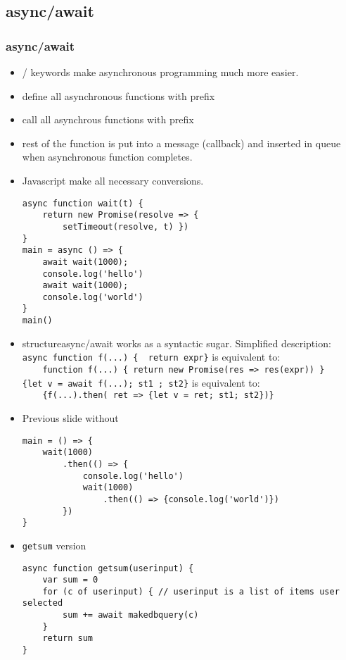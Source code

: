 \documentclass[trans,compress,xcolor=table]{beamer}
\begin{document}
\subsection*{async/await}
\begin{frame}[fragile]
\frametitle{async/await}
\begin{itemize}
\item {}/ keywords make
asynchronous programming much more easier.
\item define all asynchronous functions with  prefix
\item call all asynchrous functions with  prefix
\item rest of the function is put into a message (callback) and inserted in queue when asynchronous function completes.
\item Javascript make all necessary conversions.
\begin{lstlisting}
async function wait(t) {
	return new Promise(resolve => {
		setTimeout(resolve, t) })
}
main = async () => {
	await wait(1000);
	console.log('hello')
	await wait(1000);
	console.log('world')
}
main()
\end{lstlisting}
\end{itemize}
\end{frame}

\begin{frame}[fragile]
\begin{itemize}
\item structure{async/await} works as a syntactic sugar. Simplified description:\\
\lstinline!async function f(...) {  return expr}! is equivalent to:\\
\lstinline!    function f(...) { return new Promise(res => res(expr)) }!\\[1em]

\lstinline!{let v = await f(...); st1 ; st2}! is equivalent to:\\
\lstinline!    {f(...).then( ret => {let v = ret; st1; st2})}!
\item Previous slide without 
\begin{lstlisting}
main = () => {
	wait(1000)
		.then(() => {
			console.log('hello')
			wait(1000)
				.then(() => {console.log('world')})
		})
}
\end{lstlisting}
\end{itemize}
\end{frame}

\begin{frame}[fragile]
\begin{itemize}
\item \lstinline!getsum!  version
\begin{lstlisting}
async function getsum(userinput) {
	var sum = 0
	for (c of userinput) { // userinput is a list of items user selected
		sum += await makedbquery(c)
	}
	return sum
}
\end{lstlisting}
\end{itemize}
\end{frame}
\end{document}
